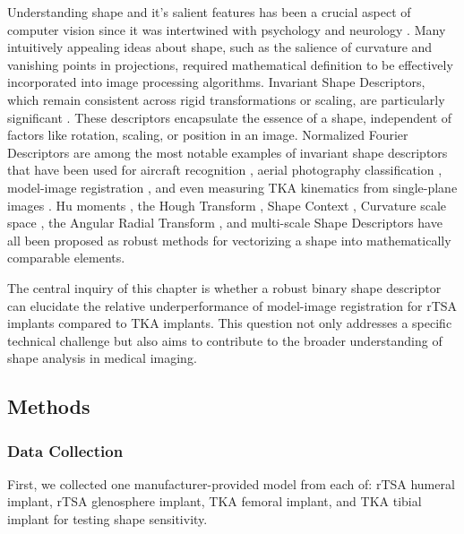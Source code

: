 Understanding shape and it's salient features has been a crucial aspect of computer vision since it was intertwined with psychology and neurology \cite{attneaveInformationalAspectsVisual1954,attneaveQuantitativeStudyShape1956}.
Many intuitively appealing ideas about shape, such as the salience of curvature and vanishing points in projections, required mathematical definition to be effectively incorporated into image processing algorithms.
Invariant Shape Descriptors, which remain consistent across rigid transformations or scaling, are particularly significant \cite{zhangReviewShapeRepresentation2004}.
These descriptors encapsulate the essence of a shape, independent of factors like rotation, scaling, or position in an image.
Normalized Fourier Descriptors are among the most notable examples of invariant shape descriptors that have been used for aircraft recognition \cite{wallaceEfficientThreedimensionalAircraft1980,wallaceAnalysisThreedimensionalMovement1980,richardIdentificationThreeDimensionalObjects1974}, aerial photography classification \cite{linClassificationPartial2D1987}, model-image registration \cite{zossoBiplanar2Dto3DRegistration2008}, and even measuring TKA kinematics from single-plane images \cite{banksAccurateMeasurementThreedimensional1996}.
Hu moments \cite{huVisualPatternRecognition1962}, the Hough Transform \cite{ballardGeneralizingHoughTransform1981}, Shape Context \cite{belongieShapeMatchingObject2002}, Curvature scale space \cite{koenderinkSurfaceShapeCurvature1992}, the Angular Radial Transform \cite{leeNewShapeDescription2012}, and multi-scale Shape Descriptors \cite{al-thelayaInShaDeInvariantShape2021} have all been proposed as robust methods for vectorizing a shape into mathematically comparable elements.

The central inquiry of this chapter is whether a robust binary shape descriptor can elucidate the relative underperformance of model-image registration for rTSA implants compared to TKA implants. This question not only addresses a specific technical challenge but also aims to contribute to the broader understanding of shape analysis in medical imaging.

\subsection{Methods}
\subsubsection{Data Collection}
First, we collected one manufacturer-provided model from each of: rTSA humeral implant, rTSA glenosphere implant, TKA femoral implant, and TKA tibial implant for testing shape sensitivity.
